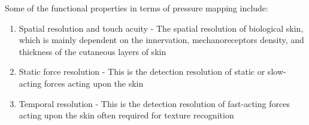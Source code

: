 Some of the functional properties in terms of pressure mapping include:
\begin{enumerate}
    \item Spatial resolution and touch acuity - The spatial resolution of biological skin, which is mainly dependent on the innervation, mechanoreceptors density, and thickness of the cutaneous layers of skin \cite{Landry2021,Klein2016, Krotoski1993}
    \item Static force resolution - This is the detection resolution of static or slow-acting forces acting upon the skin \cite{Krotoski1993}
    \item Temporal resolution - This is the detection resolution of fast-acting forces acting upon the skin often required for texture recognition \cite{Landry2021,Krotoski1993}
\end{enumerate}

